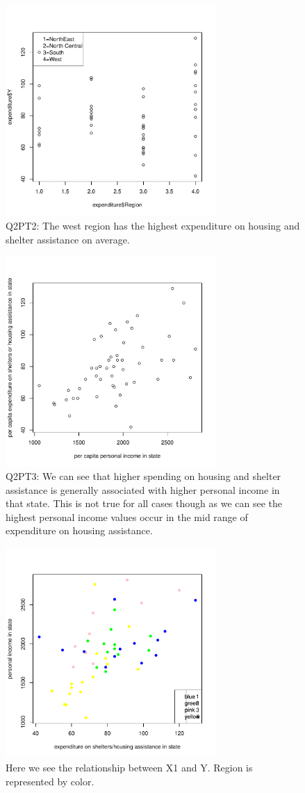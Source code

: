 \documentclass[12pt,letterpaper]{article}
\begin{document}
\begin{figure}[htp]
    \centering
    \includegraphics[width=8cm]{Region and Y.pdf}
    \caption{Q2PT2: The west region has the highest expenditure on housing and shelter assistance on average.
}
    \label{Region, Y}
\end{figure}



\begin{figure}[htp]
    \centering
    \includegraphics[width=8cm]{X1 Y Graph.pdf}
    \caption{Q2PT3: We can see that higher spending on housing and shelter assistance is generally associated with higher personal income in that state. This is not true for all cases though as we can see the highest personal income values occur in the mid range of expenditure on housing assistance.
}
    \label{X1, Y}
\end{figure}

\begin{figure}[htp]
    \centering
    \includegraphics[width=8cm]{X1, Y and Region.pdf}
    \caption{Here we see the relationship between X1 and Y. Region is represented by color.
}
    \label{x1, y, Region}
\end{figure}
\
\end{document}

